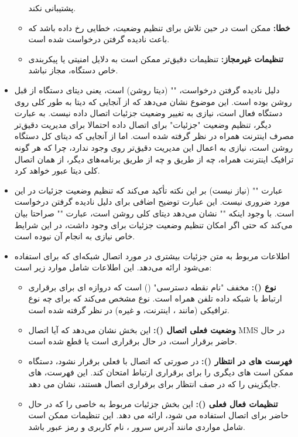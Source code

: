 \documentclass{report}
\begin{document}
\begin{itemize}
\begin{itemize}
	  	  پشتیبانی نکند.
	  	\item
	  	\textbf{خطا:}
	  	 ممکن است در حین تلاش برای تنظیم وضعیت، خطایی رخ داده باشد که باعث نادیده گرفتن درخواست شده است.
	  	\item
	\textbf{تنظیمات غیرمجاز:} تنظیمات دقیق‌تر ممکن است به دلایل امنیتی یا پیکربندی خاص دستگاه، مجاز نباشد.
	  \end{itemize}
	 \item 
	 دلیل نادیده گرفتن درخواست، 
	 "" 
	 (دیتا روشن) است، یعنی دیتای دستگاه از قبل روشن بوده است. این موضوع نشان می‌دهد که از آنجایی که دیتا به طور کلی روی دستگاه فعال است، نیازی به تغییر وضعیت جزئیات اتصال داده 
	  نیست.
	 به عبارت دیگر، تنظیم وضعیت "جزئیات" برای اتصال داده 
	 احتمالا برای مدیریت دقیق‌تر مصرف اینترنت همراه در نظر گرفته شده است. اما از آنجایی که دیتای کل دستگاه روشن است، نیازی به اعمال این مدیریت دقیق‌تر روی
	  وجود ندارد، چرا که هر گونه ترافیک اینترنت همراه، چه از طریق
	   و چه از طریق برنامه‌های دیگر، از همان اتصال کلی دیتا عبور خواهد کرد.
	   
	   \item 
	   عبارت 
	   ""
	    (نیاز نیست) بر این نکته تأکید می‌کند که تنظیم وضعیت جزئیات در این مورد ضروری نیست.
	   این عبارت توضیح اضافی برای دلیل نادیده گرفتن درخواست است. با وجود اینکه 
	   "" 
	   نشان می‌دهد دیتای کلی روشن است، عبارت 
	   ""
	    صراحتا بیان می‌کند که حتی اگر امکان تنظیم وضعیت جزئیات برای
	     وجود داشت، در این شرایط خاص نیازی به انجام آن نبوده است.
	   
	 \item 
	 اطلاعات مربوط به متن 
	 جزئیات بیشتری در مورد اتصال شبکه‌ای که برای
	   استفاده می‌شود ارائه می‌دهد. این اطلاعات شامل موارد زیر است:
	   \begin{itemize}
\item
\textbf{نوع
 (): }
  مخفف "نام نقطه دسترسی" 
  () 
  است که دروازه ای برای برقراری ارتباط با شبکه داده تلفن همراه است. نوع 
   مشخص می‌کند که برای چه نوع ترافیکی (مانند
    ، اینترنت، و غیره) در نظر گرفته شده است.
    \item
\textbf{وضعیت فعلی اتصال
 ():} 
این بخش نشان می‌دهد که آیا اتصال
 MMS
 در حال حاضر برقرار است، در حال برقراری است یا قطع شده است.
\item
\textbf{فهرست
  های در انتظار
  ():}
   در صورتی که اتصال با
     فعلی برقرار نشود، دستگاه ممکن است 
   های دیگری را برای برقراری ارتباط امتحان کند. این فهرست،
     های جایگزینی را که در صف انتظار برای برقراری اتصال هستند، نشان می دهد.
     \item
   \textbf{  تنظیمات
     فعال فعلی 
     (): }
     این بخش جزئیات مربوط به 
     خاصی را که در حال حاضر برای اتصال 
     استفاده می شود، ارائه می دهد. این تنظیمات ممکن است شامل مواردی مانند آدرس سرور
     ، نام کاربری و رمز عبور باشد.
	   \end{itemize}
	 

\end{itemize}
\end{document}
